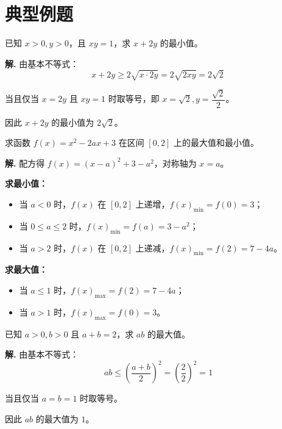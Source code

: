 \documentclass[11pt]{ctexrep}
\begin{document}
\section*{典型例题}

\begin{example}[利用基本不等式求最值]
    已知 $x > 0, y > 0$，且 $xy = 1$，求 $x + 2y$ 的最小值。
\end{example}

\textbf{解.} 由基本不等式：
\[
    x + 2y \geq 2\sqrt{x \cdot 2y} = 2\sqrt{2xy} = 2\sqrt{2}
\]

当且仅当 $x = 2y$ 且 $xy = 1$ 时取等号，即 $x = \sqrt{2}, y = \dfrac{\sqrt{2}}{2}$。

因此 $x + 2y$ 的最小值为 $2\sqrt{2}$。

\begin{example}[二次函数在闭区间上的最值]
    求函数 $f(x) = x^2 - 2ax + 3$ 在区间 $[0, 2]$ 上的最大值和最小值。
\end{example}

\textbf{解.} 配方得 $f(x) = (x-a)^2 + 3 - a^2$，对称轴为 $x = a$。

\textbf{求最小值：}
\begin{itemize}
    \item 当 $a < 0$ 时，$f(x)$ 在 $[0, 2]$ 上递增，$f(x)_{\min} = f(0) = 3$；
    \item 当 $0 \leq a \leq 2$ 时，$f(x)_{\min} = f(a) = 3 - a^2$；
    \item 当 $a > 2$ 时，$f(x)$ 在 $[0, 2]$ 上递减，$f(x)_{\min} = f(2) = 7 - 4a$。
\end{itemize}

\textbf{求最大值：}
\begin{itemize}
    \item 当 $a \leq 1$ 时，$f(x)_{\max} = f(2) = 7 - 4a$；
    \item 当 $a > 1$ 时，$f(x)_{\max} = f(0) = 3$。
\end{itemize}

\begin{realexam}[2025 上海高三二模]
    已知 $a > 0, b > 0$ 且 $a + b = 2$，求 $ab$ 的最大值。
\end{realexam}

\textbf{解.} 由基本不等式：
\[
    ab \leq \left(\frac{a+b}{2}\right)^2 = \left(\frac{2}{2}\right)^2 = 1
\]

当且仅当 $a = b = 1$ 时取等号。

因此 $ab$ 的最大值为 $1$。
\end{document}
